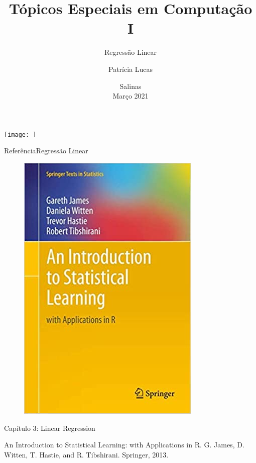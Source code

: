 \documentclass[t]{beamer}
\title[]{Tópicos Especiais em Computação I}
\subtitle[]{Regressão Linear}
\author[]{Patrícia Lucas\\{\footnotesize }}
\institute{Bacharelado em Sistemas de Informação \\ IFNMG  - Campus Salinas}
\date{\scriptsize Salinas\\Março 2021}
\begin{document}
\begin{frame}

\begin{center}
\texttt{[image: ]}
\end{center}
  \titlepage
\end{frame}


\begin{ftst}{Referência}{Regressão Linear}
\begin{figure}
    \includegraphics[scale=0.3]{Figuras/slide03_01.jpg}
\end{figure}
Capítulo 3: Linear Regression
\vone
\scriptsize

An Introduction to Statistical Learning: with Applications in R. G. James, D. Witten, T. Hastie, and R. Tibshirani. Springer, 2013.

\end{ftst}
\end{document}
